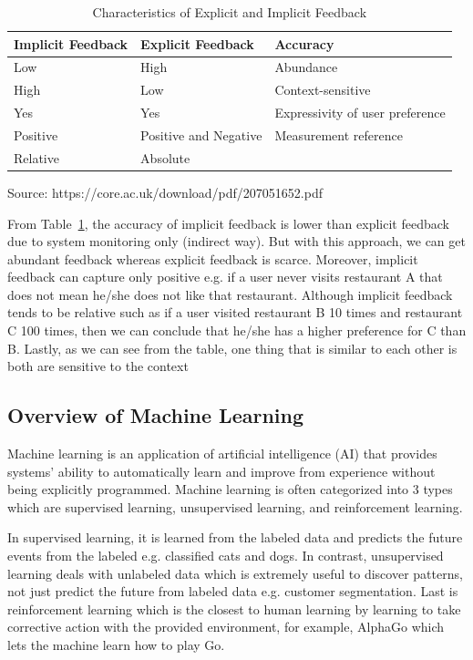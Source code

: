 \documentclass[12pt,oneside,openright,a4paper]{cpe-english-project}
\begin{document}
\begin{table}[H]
\caption{Characteristics of Explicit and Implicit Feedback}\label{tbl:2CharacteristicsofExplicitandImplicitFeedback}
\begin{tabular}{l|l|l} \hline\hline
Implicit Feedback & Explicit Feedback & Accuracy \\ \hline\hline
Low & High & Abundance \\ \hline
High & Low & Context-sensitive \\ \hline
Yes & Yes & Expressivity of user preference \\ \hline
Positive & Positive and Negative & Measurement reference \\ \hline
Relative & Absolute \\ \hline\hline
\end{tabular}\par
\smallskip
Source: https://core.ac.uk/download/pdf/207051652.pdf
\end{table}


From Table~\ref{tbl:2CharacteristicsofExplicitandImplicitFeedback}, the accuracy of implicit feedback is lower than explicit feedback due to system monitoring only (indirect way). But with this approach, we can get abundant feedback whereas explicit feedback is scarce. Moreover, implicit feedback can capture only positive e.g. if a user never visits restaurant A that does not mean he/she does not like that restaurant. Although implicit feedback tends to be relative such as if a user visited restaurant B 10 times and restaurant C 100 times, then we can conclude that he/she has a higher preference for C than B. Lastly, as we can see from the table, one thing that is similar to each other is both are sensitive to the context

\subsection{Overview of Machine Learning}

Machine learning is an application of artificial intelligence (AI) that provides systems’ ability to automatically learn and improve from experience without being explicitly programmed. \cite{WhatisMachineLearning} Machine learning is often categorized into 3 types which are supervised learning, unsupervised learning, and reinforcement learning.

In supervised learning, it is learned from the labeled data and predicts the future events from the labeled e.g. classified cats and dogs. In contrast, unsupervised learning deals with unlabeled data which is extremely useful to discover patterns, not just predict the future from labeled data e.g. customer segmentation. Last is reinforcement learning which is the closest to human learning by learning to take corrective action with the provided environment, for example, AlphaGo which lets the machine learn how to play Go.
\end{document}
